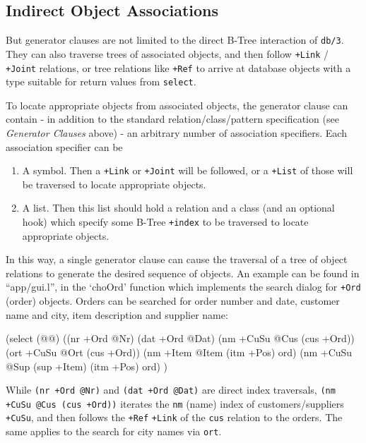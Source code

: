  
\subsection{Indirect Object Associations}
\label{sec:select-pred-indirect-object-associations}


But generator clauses are not limited to the direct B-Tree interaction
of \texttt{db/3}. They can also traverse trees of associated objects, and then
follow \texttt{+Link} / \texttt{+Joint} relations, or tree relations like \texttt{+Ref} to
arrive at database objects with a type suitable for return values from
\texttt{select}.

To locate appropriate objects from associated objects, the generator
clause can contain - in addition to the standard relation/class/pattern
specification (see \emph{Generator Clauses} above) - an arbitrary
number of association specifiers. Each association specifier can be

\begin{enumerate}
\item A symbol. Then a \texttt{+Link} or \texttt{+Joint} will be followed, or a \texttt{+List}
   of those will be traversed to locate appropriate objects.
\item A list. Then this list should hold a relation and a class (and an
   optional hook) which specify some B-Tree \texttt{+index} to be traversed to
   locate appropriate objects.
\end{enumerate}

In this way, a single generator clause can cause the traversal of a tree
of object relations to generate the desired sequence of objects. An
example can be found in ``app/gui.l'', in the `choOrd' function which
implements the search dialog for \texttt{+Ord} (order) objects. Orders can be
searched for order number and date, customer name and city, item
description and supplier name:


\begin{wideverbatim}
(select (@@)
   ((nr +Ord @Nr) (dat +Ord @Dat)
      (nm +CuSu @Cus (cus +Ord))
      (ort +CuSu @Ort (cus +Ord))
      (nm +Item @Item (itm +Pos) ord)
      (nm +CuSu @Sup (sup +Item) (itm +Pos) ord) )
\end{wideverbatim}

While \texttt{(nr +Ord @Nr)} and \texttt{(dat +Ord @Dat)} are direct index traversals,
\texttt{(nm +CuSu @Cus (cus +Ord))} iterates the \texttt{nm} (name) index of
customers/suppliers \texttt{+CuSu}, and then follows the \texttt{+Ref} \texttt{+Link} of the
\texttt{cus} relation to the orders. The same applies to the search for city
names via \texttt{ort}.

